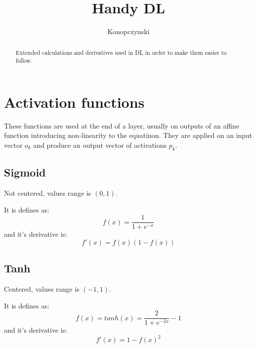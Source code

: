 \documentclass{article}
\begin{document}
\title{Handy DL}
\author{Konopczynski}

\maketitle






\begin{abstract}
Extended calculations and derivatives used in DL in order to make them easier to follow.
\end{abstract}




\section{Activation functions}
These functions are used at the end of a layer, usually on outputs of an affine function introducing non-linearity to the equatinon. They are applied on an input vector $o_k$ and produce an output vector of activations $p_k$.

\subsection{Sigmoid}
Not centered, values range is $(0,1)$.

It is defines as:
\begin{equation}
     \label{25}
f(x) = \frac{1}{1+e^{-x}}
\end{equation}
and it's derivative is:
\begin{equation}
     \label{25}
f'(x) = f(x)(1-f(x))
\end{equation}

\subsection{Tanh}
Centered, values range is $(-1,1)$.

It is defines as:
\begin{equation}
     \label{25}
f(x) = tanh(x) = \frac{2}{1+e^{-2x}} -1
\end{equation}
and it's derivative is:
\begin{equation}
     \label{25}
f'(x) = 1 - f(x)^2
\end{equation}
\end{document}
